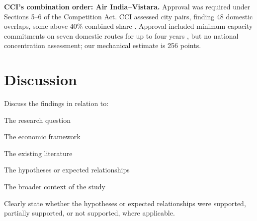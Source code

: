 \documentclass[12pt,a4paper]{article}
\newenvironment{mycontribution}{\par\color{blue}\captionsetup{font+={color=blue}}}{\par}
\newcommand{\templatebullet}[1]{\par\noindent\textbullet\hspace{5.88pt}#1\par}
\begin{document}
\begin{mycontribution}
\textbf{CCI's combination order: Air India--Vistara.} Approval was required under Sections 5--6 of the Competition Act. CCI assessed city pairs, finding 48 domestic overlaps, some above 40\% combined share \parencite[paras.~19, 109--111]{cci2023vistara}. Approval included minimum-capacity commitments on seven domestic routes for up to four years \parencite[paras.~115--118, 126--127]{cci2023vistara}, but no national concentration assessment; our mechanical estimate is 256 points.
\end{mycontribution}

\section{Discussion}
Discuss the findings in relation to:
\templatebullet{The research question}
\templatebullet{The economic framework}
\templatebullet{The existing literature}
\templatebullet{The hypotheses or expected relationships}
\templatebullet{The broader context of the study}
Clearly state whether the hypotheses or expected relationships were supported, partially supported, or not supported, where applicable.
\end{document}
